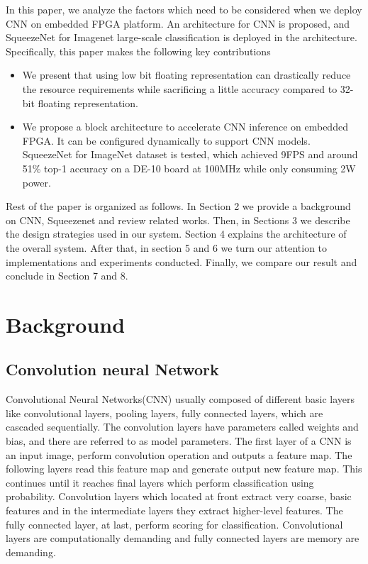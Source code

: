 \documentclass[conference]{IEEEtran}
\begin{document}
In this paper, we analyze the factors which need to be considered when we deploy CNN on embedded FPGA platform. An architecture for CNN is proposed, and SqueezeNet for Imagenet large-scale classification is deployed in the architecture. Specifically, this paper makes the following key contributions

\begin{itemize}
\item
We present that using low bit floating representation can drastically reduce the resource requirements while sacrificing a little accuracy compared to 32-bit floating representation.
\item 
We propose a block architecture to accelerate CNN inference on embedded FPGA. It can be configured dynamically to support CNN models. SqueezeNet for ImageNet dataset is tested, which achieved 9FPS and around 51\% top-1 accuracy on a DE-10 board at 100MHz while only consuming 2W power.
\end{itemize}
Rest of the paper is organized as follows. In Section 2 we provide a background on CNN, Squeezenet and review related works. Then, in Sections 3 we describe the design strategies used in our system. Section 4 explains the architecture of the overall system. After that, in section 5 and 6 we turn our attention to implementations and experiments conducted.  Finally, we compare our result and conclude in Section 7 and 8.

\section{Background}
\subsection{Convolution neural Network}
Convolutional Neural Networks(CNN) usually composed of different basic layers like convolutional layers, pooling layers, fully connected layers, which are cascaded sequentially. The convolution layers have parameters called weights and bias, and there are referred to as model parameters. The first layer of a CNN is an input image, perform convolution operation and outputs a feature map. The following layers read this feature map and generate output new feature map. This continues until it reaches final layers which perform classification using probability. Convolution layers which located at front extract very coarse, basic features and in the intermediate layers they extract higher-level features. The fully connected layer, at last, perform scoring for classification. Convolutional layers are computationally demanding and fully connected layers are memory are demanding. 
\end{document}
